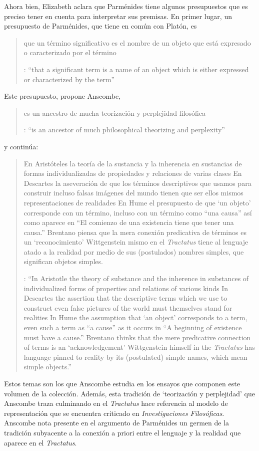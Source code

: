 Ahora bien, Elizabeth aclara que Parménides tiene algunos presupuestos que es preciso tener en cuenta para interpretar sus premisas. En primer lugar, un presupuesto de Parménides, que tiene en común con Platón, es \blockquote[{\cite[x]{anscombe1981parmenides}}: \enquote{that a significant term is a name of an object which is either expressed or characterized by the term}]{que un término significativo es el nombre de un objeto que está expresado o caracterizado por el término}. Este presupuesto, propone Anscombe, \blockquote[{\cite[xi]{anscombe1981parmenides}}: \enquote{is an ancestor of much philosophical theorizing and perplexity}]{es un ancestro de mucha teorización y perplejidad filosófica} y continúa: \blockquote[{\cite[xi]{anscombe1981parmenides}}: \enquote{In Aristotle \textelp{} the theory of substance and the inherence in substances of individualized forms of properties and relations of various kinds \textelp{} In Descartes \textelp{} the assertion that the descriptive terms which we use to construct even false pictures of the world must themselves stand for realities \textelp{} In Hume \textelp{} the assumption that `an object' corresponds to a term, even such a term as ``a cause'' as it occurs in ``A beginning of existence must have a cause.'' \textelp{} Brentano thinks that the mere predicative connection of terms is an `acknowledgement' \textelp{} Wittgenstein himself in the \emph{Tractatus} has language pinned to reality by its (postulated) simple names, which mean simple objects.}]{En Aristóteles \textelp{} la teoría de la sustancia y la inherencia en sustancias de formas individualizadas de propiedades y relaciones de varias clases \textelp{} En Descartes \textelp{} la aseveración de que los términos descriptivos que usamos para construir incluso falsas imágenes del mundo tienen que ser ellos mismos representaciones de realidades \textelp{} En Hume \textelp{} el presupuesto de que `un objeto' corresponde con un término, incluso con un término como ``una causa'' así como aparece en ``El comienzo de una existencia tiene que tener una causa.'' \textelp{} Brentano piensa que la mera conexión predicativa de términos es un `reconocimiento' \textelp{} Wittgenstein mismo en el \emph{Tractatus} tiene al lenguaje atado a la realidad por medio de sus (postulados) nombres simples, que significan objetos simples.} Estos temas son los que Anscombe estudia en los ensayos que componen este volumen de la colección. Además, esta tradición de \enquote*{teorización y perplejidad} que Anscombe traza culminando en el \emph{Tractatus} hace referencia al modelo de representación que se encuentra criticado en \emph{Investigaciones Filosóficas}. Anscombe nota presente en el argumento de Parménides un germen de la tradición subyacente a la conexión a priori entre el lenguaje y la realidad que aparece en el \emph{Tractatus}.

